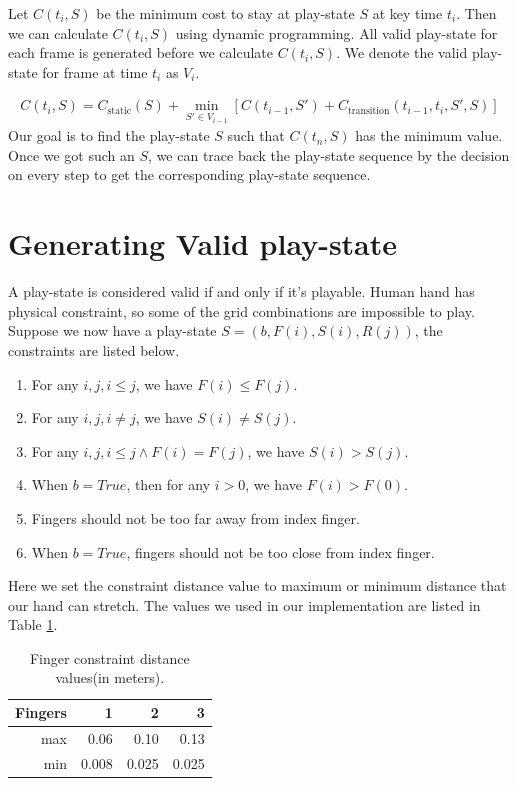 Let $C(t_i, S)$ be the minimum cost to stay at play-state $S$ at key time $t_i$. Then we can calculate $C(t_i, S)$ using dynamic programming.
All valid play-state for each frame is generated before we calculate $C(t_i, S)$.  We denote the valid play-state for frame at time $t_i$ as $V_i$.

\begin{eqnarray}
    C(t_i, S) = C_{\mathrm{static}}(S) +
        \min_{S' \in V_{i-1}} \left[
            C(t_{i-1}, S') + 
            C_{\mathrm{transition}}(t_{i-1}, t_i, S', S) 
        \right]
    \label{eqn:transition}
\end{eqnarray}
Our goal is to find the play-state $S$ such that $C(t_n, S)$ has the minimum value. Once we got such an $S$,  we can trace back the play-state sequence by the decision on every step to get the corresponding play-state sequence. 


\section{Generating Valid play-state}
A play-state is considered valid if and only if it's playable. Human hand has physical constraint, so some of the grid combinations are impossible to play. Suppose we now have a play-state $S=(b, F(i), S(i), R(j))$, the constraints are listed below.
\begin{enumerate}
    \item For any $i, j, i \le j$, we have $F(i) \le F(j)$.
    \item For any $i, j, i \neq j$, we have $S(i) \neq S(j)$.
    \item For any $i, j, i \le j \land F(i) = F(j)$, we have $S(i) > S(j)$.
    \item When $b = True$, then for any $i > 0$, we have $F(i) > F(0)$.
    \item Fingers should not be too far away from index finger.
    \item When $b = True$, fingers should not be too close from index finger.
\end{enumerate}

Here we set the constraint distance value to maximum or minimum distance that our hand can stretch. The values we used in our implementation are listed in Table \ref{table:finger-constraints}.

\begin{table}[h]
    \centering
    \begin{tabular}{r|r|r|r}
        Fingers & 1 & 2 & 3 \\
        \hline
        max & 0.06 & 0.10 & 0.13 \\
        min & 0.008 & 0.025 & 0.025 \\
    \end{tabular}
    \caption{Finger constraint distance values(in meters).}
    \label{table:finger-constraints}
\end{table}

